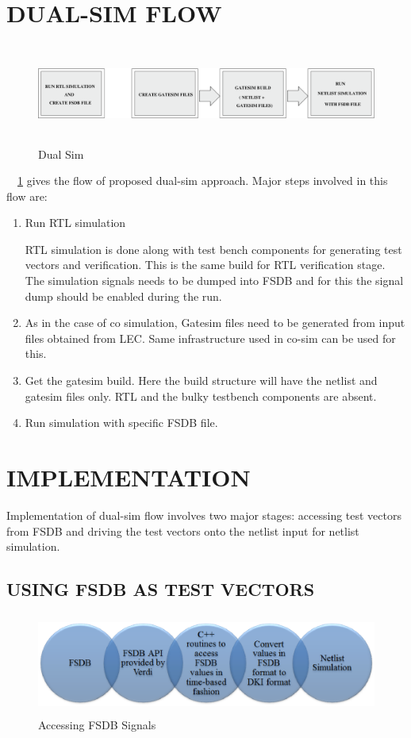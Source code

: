 \section {DUAL-SIM FLOW}

\begin{figure}[H]
\centering
\includegraphics[width=6in, height=1.3in]{./figures/dualsim_flow.eps}
\caption{Dual Sim}
\label{fig:dualsim_flow.eps}
\end{figure}

~\figurename{~\ref{fig:dualsim_flow.eps}} gives the flow of proposed dual-sim approach. Major steps involved in this flow are:

\begin{enumerate}
	\item Run RTL simulation

	RTL simulation is done along with test bench components for generating test vectors and verification. This is the same build for RTL verification stage. The simulation signals needs to be dumped into FSDB and for this the signal dump should be enabled during the run.
	\item As in the case of co simulation, Gatesim files need to be generated from input files obtained from LEC. Same infrastructure used in co-sim can be used for this.
	\item Get the gatesim build. Here the build structure will have the netlist and gatesim files only. RTL and the bulky testbench components are absent.
	\item Run simulation with specific FSDB file.
\end{enumerate}


\section{IMPLEMENTATION}

Implementation of dual-sim flow involves two major stages: accessing test vectors from FSDB and driving the test vectors onto the netlist input for netlist simulation.
\subsection{USING FSDB AS TEST VECTORS}
\begin{figure}[H]
\centering
\includegraphics[width=5in, height=1.3in]{./figures/fsdb.eps}
\caption{Accessing FSDB Signals}
\label{fig:fsdb.eps}
\end{figure}


